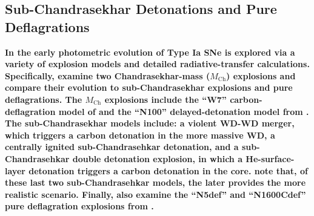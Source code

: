 \documentclass[twocolumn]{aastex61}
\begin{document}
\subsection{\textbf{Sub-Chandrasekhar Detonations and Pure Deflagrations}}

\textbf{In \citet{2017MNRAS.472.2787N} the early photometric evolution of Type
Ia SNe is explored via a variety of explosion models and detailed
radiative-transfer calculations. Specifically, \citet{2017MNRAS.472.2787N}
examine two Chandrasekhar-mass ($M_\mathrm{Ch}$) explosions and compare their
evolution to sub-Chandrasekhar explosions and pure deflagrations. The
$M_\mathrm{Ch}$ explosions include the ``W7'' carbon-deflagration model of
\citet{1984ApJ...286..644N} and the ``N100'' delayed-detonation model from
\citet{2013MNRAS.429.1156S}. The sub-Chandrasekhar models include: a violent
WD-WD merger, which triggers a carbon detonation in the more massive WD, a
centrally ignited sub-Chandrasehkar detonation, and a sub-Chandrasehkar double
detonation explosion, in which a He-surface-layer detonation triggers a carbon
detonation in the core. \citet{2017MNRAS.472.2787N} note that, of these
last two sub-Chandrasehkar models, the later provides the more realistic
scenario. Finally, \citet{2017MNRAS.472.2787N} also examine the ``N5def'' and
``N1600Cdef'' pure deflagration explosions from \citet{2014MNRAS.438.1762F}.}
\end{document}
